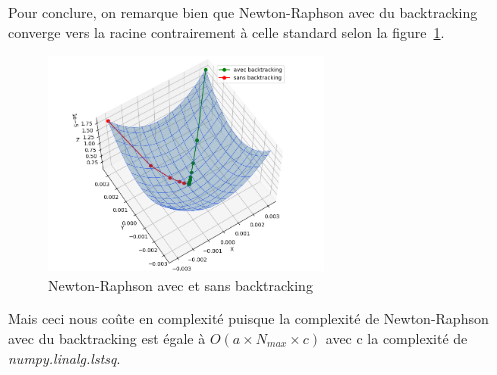 Pour conclure, on remarque bien que Newton-Raphson avec du backtracking converge vers la racine
contrairement à celle standard selon la figure~\ref{fig:p1-cvg}.
\begin{figure}[htbp]
\centering
\includegraphics[width=0.65\textwidth]{res/fast_convergence_bt.png}
\caption{Newton-Raphson avec et sans backtracking}
\label{fig:p1-cvg}
\end{figure}
Mais ceci nous coûte en complexité puisque la complexité de Newton-Raphson avec du backtracking
est égale à $O(a \times N_{max} \times c)$ avec c la complexité de \emph{numpy.linalg.lstsq}.